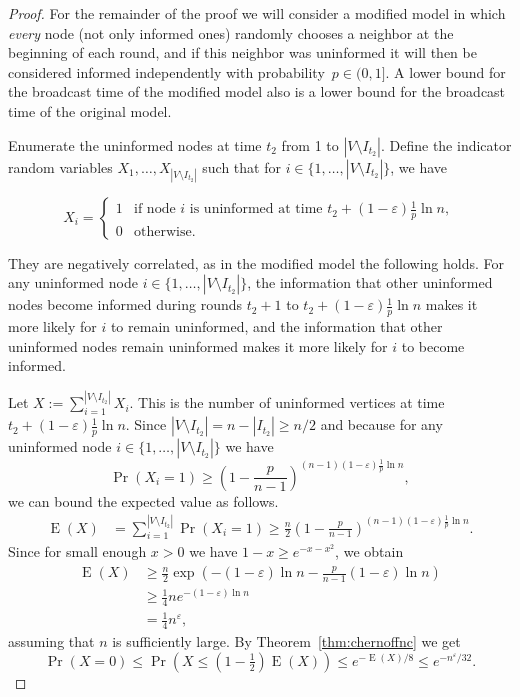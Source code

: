 \documentclass[12pt]{article}
\newcommand{\e}{\varepsilon}
\DeclareMathOperator{\E}{E}
\newcommand{\thmref}[1]{Theorem~\ref{thm:#1}}
\begin{document}
{\begin{proof}
For the remainder of the proof we will consider a modified model in which \emph{every} node (not only informed ones) randomly chooses a neighbor at the beginning of each round, and if this neighbor was uninformed it will then be considered informed independently with probability~$p \in (0,1]$. A lower bound for the broadcast time of the modified model also is a lower bound for the broadcast time of the original model. 

Enumerate the uninformed nodes at time $t_2$ from 1 to $|V\setminus I_{t_2}|$. 
Define the indicator random variables $X_1,\dots , X_{|V\setminus I_{t_2}|}$ such that for $i \in \{1, \dots, |V\setminus I_{t_2}|\}$, we have

\begin{equation*}
X_i=\begin{cases}
     1 &\mbox{if node }i\mbox{ is uninformed at time }t_2+(1-\e)\frac{1}{p}\ln n,\\
     0 &\mbox{otherwise.}
    \end{cases}
\end{equation*}

They are negatively correlated, as in the modified model the following holds. For any uninformed node $i \in \{1, \dots, |V\setminus I_{t_2}|\}$, the information that other uninformed nodes become informed during rounds $t_2+1$ to $t_2+(1-\e)\frac{1}{p}\ln n$ makes it more likely for $i$ to remain uninformed, and the information that other uninformed nodes remain uninformed makes it more likely for $i$ to become informed.

Let $X:=\sum_{i=1}^{|V\setminus I_{t_2}|} X_i$. 
This is the number of uninformed vertices at time $t_2+(1-\e)\frac{1}{p}\ln n$. 
Since $|V\setminus I_{t_2}| = n - |I_{t_2}| \geq n/2$ and because for any uninformed node $i \in \{1, \dots, |V\setminus I_{t_2}|\}$ we have
\begin{equation*}
\Pr(X_i=1)\geq \left(1-\frac{p}{n-1}	\right)^{(n-1)(1-\e)\frac{1}{p}\ln n},
\end{equation*}
we can bound the expected value as follows.
\begin{align*}
 \E(X) &= \sum_{i=1}^{|V\setminus I_{t_2}|} \Pr(X_i=1)
\geq \frac{n}{2}\left(1-\frac{p}{n-1}	\right)^{(n-1)(1-\e)\frac{1}{p}\ln n}.
\end{align*}
Since for small enough $x > 0$ we have $1 - x \geq e^{-x-x^2}$, we obtain
\begin{align*}
 \E(X) 
&\geq \frac{n}{2}\exp\left(-(1-\e)\ln n-\frac{p}{n-1}(1-\e)\ln n\right)\\
&\geq \tfrac{1}{4}ne^{-(1-\e)\ln n}\\
&= \tfrac{1}{4}n^\e,
\end{align*}
assuming that $n$ is sufficiently large.
By \thmref{chernoffnc} we get
\begin{equation*}
\Pr(X=0)\leq \Pr\left(X\leq (1-\tfrac{1}{2})\E(X)\right)\leq e^{-\E(X)/8} \leq e^{-n^\e/32}.
\end{equation*}


\end{proof}}
\end{document}
